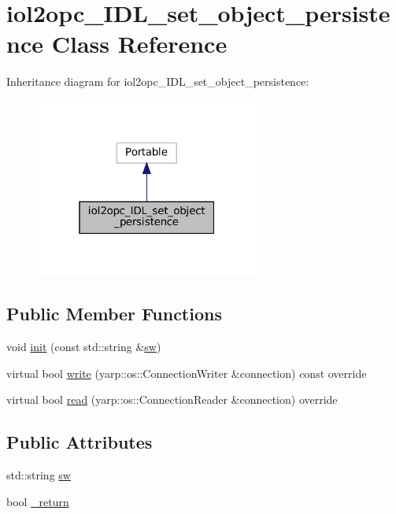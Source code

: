 \hypertarget{classiol2opc__IDL__set__object__persistence}{}\section{iol2opc\+\_\+\+I\+D\+L\+\_\+set\+\_\+object\+\_\+persistence Class Reference}
\label{classiol2opc__IDL__set__object__persistence}


Inheritance diagram for iol2opc\+\_\+\+I\+D\+L\+\_\+set\+\_\+object\+\_\+persistence\+:
\nopagebreak
\begin{figure}[H]
\begin{center}
\leavevmode
\includegraphics[width=208pt]{classiol2opc__IDL__set__object__persistence__inherit__graph}
\end{center}
\end{figure}
\subsection*{Public Member Functions}
\begin{DoxyCompactItemize}
\item 
void \hyperlink{classiol2opc__IDL__set__object__persistence_a2ec628944747a963e9b9a77d536d281f}{init} (const std\+::string \&\hyperlink{classiol2opc__IDL__set__object__persistence_ad1cfe762cb32fe3d36a631a7e35d0884}{sw})
\item 
virtual bool \hyperlink{classiol2opc__IDL__set__object__persistence_ad29b941b90fdc1b88a8fe82851f39690}{write} (yarp\+::os\+::\+Connection\+Writer \&connection) const override
\item 
virtual bool \hyperlink{classiol2opc__IDL__set__object__persistence_a28c3cca70d3ad4d651fc22d888e519c4}{read} (yarp\+::os\+::\+Connection\+Reader \&connection) override
\end{DoxyCompactItemize}
\subsection*{Public Attributes}
\begin{DoxyCompactItemize}
\item 
std\+::string \hyperlink{classiol2opc__IDL__set__object__persistence_ad1cfe762cb32fe3d36a631a7e35d0884}{sw}
\item 
bool \hyperlink{classiol2opc__IDL__set__object__persistence_a5adaee905bf0407ee10803ee7e0cceed}{\+\_\+return}
\end{DoxyCompactItemize}


